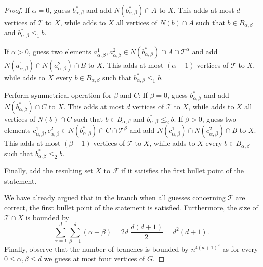 \documentclass[11pt,a4paper]{article}
\theoremstyle{definition}
\def\T{\mathcal{T}}
\begin{document}
\begin{proof}
    If $\alpha=0$, guess $b_{\alpha,\beta}^\ast$ and add $N(b^\ast_{\alpha,\beta}) \cap A$ to $X$.
    This adds at most $d$ vertices of $\T$ to $X$, while adds to $X$
    all vertices of $N(b) \cap A$ such that $b \in B_{\alpha,\beta}$ and $b_{\alpha,\beta}^\ast \leq_1 b$.
        
    If $\alpha > 0$, guess two elements $a_{\alpha,\beta}^1,a_{\alpha,\beta}^2 \in N(b^\ast_{\alpha,\beta}) \cap A \cap \T^\alpha$
    and add $N(a_{\alpha,\beta}^1) \cap N(a_{\alpha,\beta}^2) \cap B$ to $X$.
    This adds at most $(\alpha-1)$ vertices of $\T$ to $X$, while adds to $X$ every
    $b \in B_{\alpha,\beta}$ such that $b^\ast_{\alpha,\beta} \leq_1 b$. 

    Perform symmetrical operation for $\beta$ and $C$:
    If $\beta=0$, guess $b_{\alpha,\beta}^\ast$ and add $N(b^\ast_{\alpha,\beta}) \cap C$ to $X$.
    This adds at most $d$ vertices of $\T$ to $X$, while adds to $X$
    all vertices of $N(b) \cap C$ such that $b \in B_{\alpha,\beta}$ and $b_{\alpha,\beta}^\ast \leq_2 b$.
    If $\beta > 0$, guess two elements $c_{\alpha,\beta}^1,c_{\alpha,\beta}^2 \in N(b^\ast_{\alpha,\beta}) \cap C \cap \T^\beta$
    and add $N(c_{\alpha,\beta}^1) \cap N(c_{\alpha,\beta}^2) \cap B$ to $X$.
    This adds at most $(\beta-1)$ vertices of $\T$ to $X$, while adds to $X$ every
    $b \in B_{\alpha,\beta}$ such that $b^\ast_{\alpha,\beta} \leq_2 b$. 

    Finally, add the resulting set $X$ to $\mathcal{F}$ if it satisfies the first bullet point
    of the statement. 

    We have already argued that in the branch when all guesses concerning $\T$ are correct,
    the first bullet point of the statement is satisfied. Furthermore, the size of $\T \cap X$ is bounded by
    \[ \sum_{\alpha=1}^d \sum_{\beta=1}^d \left( \alpha + \beta \right) = 2d \; \frac{d(d+1)}{2} = d^2(d+1).\]
    Finally, observe that the number of branches is bounded by $n^{4(d+1)^2}$
    as for every $0 \leq \alpha,\beta \leq d$ we guess at most four vertices of $G$. 
\end{proof}
\end{document}
